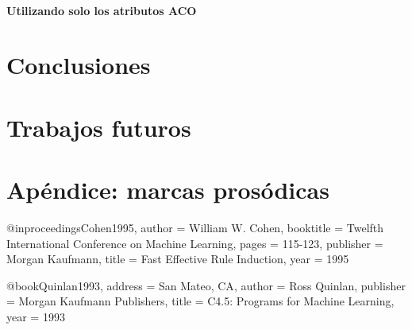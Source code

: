 \documentclass[11pt,a4paper,twoside]{tesis}
\begin{document}
\subsubsection{Utilizando solo los atributos ACO}

\chapter{Conclusiones}
\chapter{Trabajos futuros}
\chapter{Apéndice: marcas prosódicas}

\backmatter

 
 @inproceedings{Cohen1995,
    author = {William W. Cohen},
    booktitle = {Twelfth International Conference on Machine Learning},
    pages = {115-123},
    publisher = {Morgan Kaufmann},
    title = {Fast Effective Rule Induction},
    year = {1995}
 } 
 
 @book{Quinlan1993,
    address = {San Mateo, CA},
    author = {Ross Quinlan},
    publisher = {Morgan Kaufmann Publishers},
    title = {C4.5: Programs for Machine Learning},
    year = {1993}
 }
 
\end{document}
